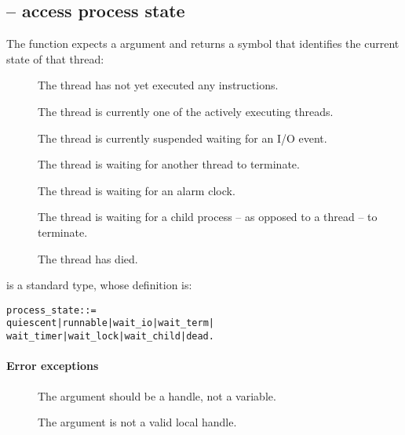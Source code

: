 \subsection{ -- access process state}
\label{misc:prstate}

     
The  function expects a  argument and returns a symbol that identifies the current state of that thread:

\begin{description}
\item[]
The thread has not yet executed any instructions.

\item[]
The thread is currently one of the actively executing threads.

\item[]
The thread is currently suspended waiting for an I/O event.

\item[]
The thread is waiting for another thread to terminate.

\item[]
The thread is waiting for an alarm clock.

\item[]
The thread is waiting for a child process -- as opposed to a thread -- to terminate.

\item[]
The thread has died.
\end{description}

 is a standard type, whose definition is:
\begin{alltt}
process\_state ::= 
  quiescent | runnable | wait\_io | wait\_term |
  wait\_timer | wait\_lock | wait\_child | dead.
\end{alltt}

\paragraph{Error exceptions}
\begin{description}
\item[]
The  argument should be a handle, not a variable.
\item[]
The  argument is not a valid local handle.
\end{description}

